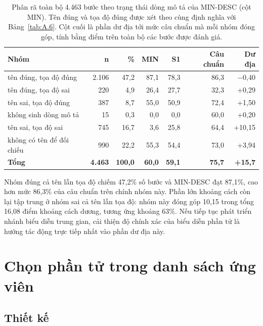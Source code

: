 \begin{table}[htbp]
\centering\small
\caption[Phân rã toàn bộ 4.463 bước theo trạng thái dòng mô tả của MIN-DESC (cột MIN).]{Phân rã toàn bộ 4.463 bước theo trạng thái dòng mô tả của MIN-DESC (cột MIN). Tên đúng và tọa độ đúng được xét theo cùng định nghĩa với Bảng~\ref{tab:A.6}. Cột cuối là phần dư địa tới mức câu chuẩn mà mỗi nhóm đóng góp, tính bằng điểm trên toàn bộ các bước được đánh giá.}\label{tab:A.7}
\setlength{\tabcolsep}{3pt}
\begin{tabularx}{\textwidth}{@{}>{\raggedright\arraybackslash\hsize=1.00\hsize}Xrrrrrr@{}}
\toprule
\textbf{Nhóm} & \textbf{n} & \textbf{\%} & \textbf{MIN} & \textbf{S1} & \textbf{Câu chuẩn} & \textbf{Dư địa} \\
\midrule
tên đúng, tọa độ đúng & 2.106 & 47,2 & 87,1 & 78,3 & 86,3 & $-$0,40 \\
tên đúng, tọa độ sai & 220 & 4,9 & 26,4 & 27,7 & 32,3 & +0,29 \\
tên sai, tọa độ đúng & 387 & 8,7 & 55,0 & 50,9 & 72,4 & +1,50 \\
không sinh dòng mô tả & 15 & 0,3 & 0,0 & 0,0 & 60,0 & +0,20 \\
tên sai, tọa độ sai & 745 & 16,7 & 3,6 & 25,8 & 64,4 & +10,15 \\
không có tên để đối chiếu & 990 & 22,2 & 55,3 & 54,4 & 73,0 & +3,94 \\
\textbf{Tổng} & \textbf{4.463} & \textbf{100,0} & \textbf{60,0} & \textbf{59,1} & \textbf{75,7} & \textbf{+15,7} \\
\bottomrule
\end{tabularx}
\end{table}

Nhóm đúng cả tên lẫn tọa độ chiếm 47,2\% số bước và MIN-DESC đạt 87,1\%, cao hơn mức 86,3\% của câu chuẩn trên chính nhóm này. Phần lớn khoảng cách còn lại tập trung ở nhóm sai cả tên lẫn tọa độ: nhóm này đóng góp 10,15 trong tổng 16,08 điểm khoảng cách dương, tương ứng khoảng 63\%. Nếu tiếp tục phát triển nhánh biểu diễn trung gian, cải thiện độ chính xác của biểu diễn phần tử là hướng tác động trực tiếp nhất vào phần dư địa này.

\section{Chọn phần tử trong danh sách ứng viên}\label{sec:A.3}

\subsection{Thiết kế}\label{sec:A.3.1}


